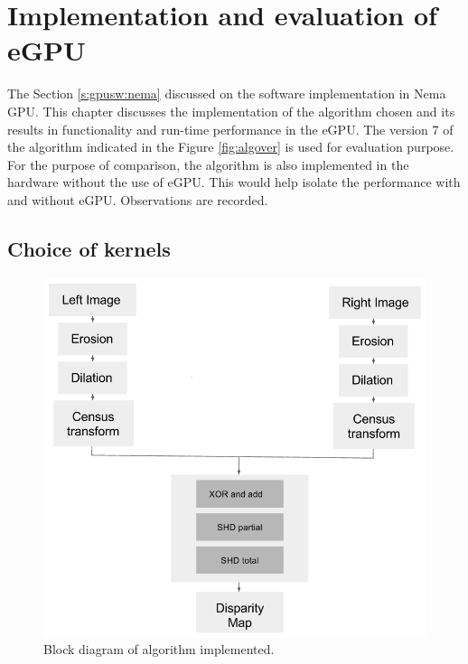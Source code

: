 \chapter{Implementation and evaluation of eGPU}
\label{chap:implementation}

The Section \ref{s:gpusw:nema} discussed on the software implementation in Nema GPU. This chapter discusses the implementation of the algorithm chosen and its results in functionality and run-time performance in the eGPU. The version 7 of the algorithm indicated in the Figure \ref{fig:algover} is used for evaluation purpose. For the purpose of comparison, the algorithm is also implemented in the hardware without the use of eGPU. This would help isolate the performance with and without eGPU. Observations are recorded.
%

\section{Choice of kernels}
\label{sec:kernelchoice}

\begin{figure}
    \center
    \includegraphics[width=.7\linewidth]{figures/Algorithm}
    \caption{Block diagram of algorithm implemented.}
    \label{fig:algorithm}
\end{figure}

